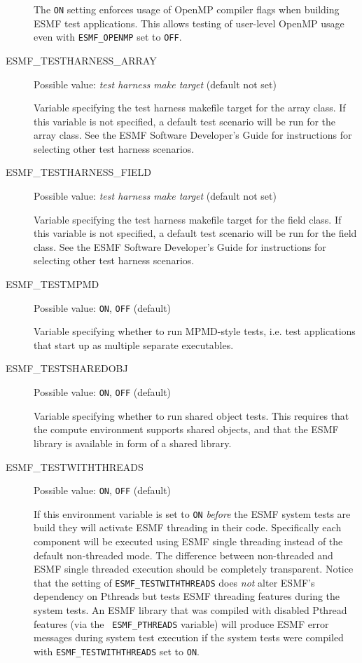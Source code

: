 \begin{description}
The {\tt ON} setting enforces usage of OpenMP compiler flags when building ESMF test applications. This allows testing of user-level OpenMP usage even with {\tt ESMF\_OPENMP} set to {\tt OFF}.

\item[ESMF\_TESTHARNESS\_ARRAY]
Possible value: {\em test harness make target} (default not set)

Variable specifying the test harness makefile target for the array class.  If this variable is not specified, a default test scenario will be run for the array class.  See the ESMF Software Developer's Guide for instructions for selecting other test harness scenarios.

\item[ESMF\_TESTHARNESS\_FIELD]
Possible value: {\em test harness make target} (default not set)

Variable specifying the test harness makefile target for the field class.  If this variable is not specified, a default test scenario will be run for the field class.  See the ESMF Software Developer's Guide for instructions for selecting other test harness scenarios.

\item[ESMF\_TESTMPMD] 
Possible value: {\tt ON}, {\tt OFF} (default)

Variable specifying whether to run MPMD-style tests, i.e. test applications
that start up as multiple separate executables.

\item[ESMF\_TESTSHAREDOBJ]
Possible value: {\tt ON}, {\tt OFF} (default)

Variable specifying whether to run shared object tests. This requires that the compute environment supports shared objects, and that the ESMF library is available in form of a shared library.

\item[ESMF\_TESTWITHTHREADS]
Possible value: {\tt ON}, {\tt OFF} (default)

If this environment variable is set to {\tt ON} {\em before} the ESMF system
tests are build they will activate ESMF threading in their code. Specifically
each component will be executed using ESMF single threading instead of the
default non-threaded mode. The difference between non-threaded and ESMF
single threaded execution should be completely transparent. Notice that the
setting of {\tt ESMF\_TESTWITHTHREADS} does {\em not} alter ESMF's dependency
on Pthreads but tests ESMF threading features during the system tests. An
ESMF library that was compiled with disabled Pthread features (via the {\tt
ESMF\_PTHREADS} variable) will produce ESMF error messages during system test
execution if the system tests were compiled with {\tt ESMF\_TESTWITHTHREADS}
set to {\tt ON}.


\end{description}
